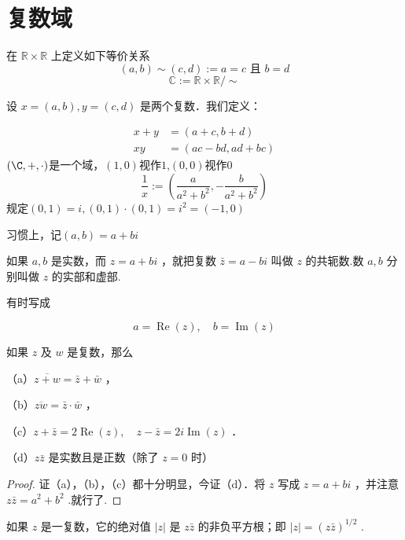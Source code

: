 \section{复数域}
\begin{definition}
	
	在 $ \mathbb{R} \times \mathbb{R}$  上定义如下等价关系 
	$$(a, b) \sim(c, d):=a=c \text { 且 } b=d$$
	$$\mathbb{C}:=\mathbb{R} \times \mathbb{R} / \sim$$
	
	
	设 $x=(a, b), y=(c, d)$ 是两个复数．我们定义：
	
	$$
	\begin{aligned}
		x+y & =(a+c, b+d) \\
		x y & =(a c-b d, a d+b c)
	\end{aligned}
	$$
	$(\C,+,\cdot)$是一个域，$(1,0)$视作$1$,$(0,0)$视作$0$
	$$\dfrac{1}{x}:=(\dfrac{a}{a^2+b^2},-\dfrac{b}{a^2+b^2})$$
	规定$(0,1)=i,(0,1)\cdot(0,1)=i^2=(-1,0)$
	
	习惯上，记$(a,b)=a+bi$
\end{definition}
\begin{definition}
	如果 $a, b$ 是实数，而 $z=a+b i$ ，就把复数 $\bar{z}=a-b i$ 叫做 $z$ 的共轭数.数 $a, b$ 分别叫做 $z$ 的实部和虚部.
	
	有时写成
	
	$$
	a=\operatorname{Re}(z), \quad b=\operatorname{Im}(z)
	$$
	
	
\end{definition}
\begin{proposition}
	\label{proofcon}
	如果 $z$ 及 $w$ 是复数，那么
	
	（a）$\overline{z+w}=\bar{z}+\bar{w}$ ，
	
	（b）$\overline{z w}=\bar{z} \cdot \bar{w}$ ，
	
	（c）$z+\bar{z}=2 \operatorname{Re}(z), \quad z- \bar{z}=2 i \operatorname{Im}(z)$ ．
	
	（d）$z \bar{z}$ 是实数且是正数（除了 $z=0$ 时）
\end{proposition}

\begin{proof}
	证（a），（b），（c）都十分明显，今证（d）．将 $z$ 写成 $z=a+b i$ ，并注意 $z \bar{z}= a^2+b^2$ .就行了.
\end{proof}
\begin{definition}
	如果 $z$ 是一复数，它的绝对值 $|z|$ 是 $z \bar{z}$ 的非负平方根；即 $|z|=(z \bar{z})^{1 / 2}$ .
	
\end{definition}

